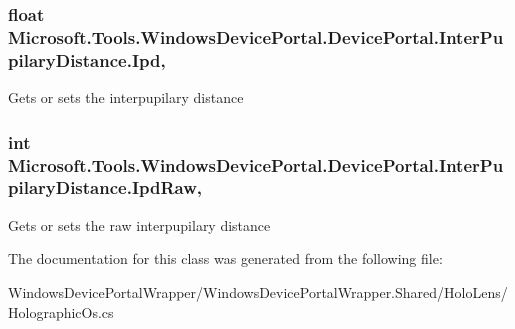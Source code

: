 \subsubsection[{\texorpdfstring{Ipd}{Ipd}}]{\setlength{\rightskip}{0pt plus 5cm}float Microsoft.\+Tools.\+Windows\+Device\+Portal.\+Device\+Portal.\+Inter\+Pupilary\+Distance.\+Ipd\hspace{0.3cm}{\ttfamily [get]}, {\ttfamily [set]}}\hypertarget{class_microsoft_1_1_tools_1_1_windows_device_portal_1_1_device_portal_1_1_inter_pupilary_distance_a5c4888665e1fca9932ebb34f92939711}{}\label{class_microsoft_1_1_tools_1_1_windows_device_portal_1_1_device_portal_1_1_inter_pupilary_distance_a5c4888665e1fca9932ebb34f92939711}


Gets or sets the interpupilary distance 

\subsubsection[{\texorpdfstring{Ipd\+Raw}{IpdRaw}}]{\setlength{\rightskip}{0pt plus 5cm}int Microsoft.\+Tools.\+Windows\+Device\+Portal.\+Device\+Portal.\+Inter\+Pupilary\+Distance.\+Ipd\+Raw\hspace{0.3cm}{\ttfamily [get]}, {\ttfamily [set]}}\hypertarget{class_microsoft_1_1_tools_1_1_windows_device_portal_1_1_device_portal_1_1_inter_pupilary_distance_a33421a9c03ce6a59da39b690d43387e2}{}\label{class_microsoft_1_1_tools_1_1_windows_device_portal_1_1_device_portal_1_1_inter_pupilary_distance_a33421a9c03ce6a59da39b690d43387e2}


Gets or sets the raw interpupilary distance 



The documentation for this class was generated from the following file\+:\begin{DoxyCompactItemize}
\item 
Windows\+Device\+Portal\+Wrapper/\+Windows\+Device\+Portal\+Wrapper.\+Shared/\+Holo\+Lens/Holographic\+Os.\+cs\end{DoxyCompactItemize}
